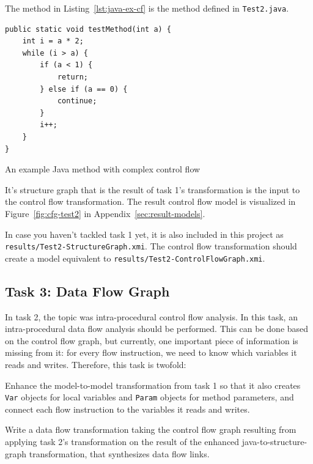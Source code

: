 \documentclass[10pt]{article}
\begin{document}
The method in Listing~\ref{lst:java-ex-cf} is the method defined in
\verb|Test2.java|.

\begin{listing}
  \begin{verbatim}
public static void testMethod(int a) {
    int i = a * 2;
    while (i > a) {
        if (a < 1) {
            return;
        } else if (a == 0) {
            continue;
        }
        i++;
    }
}
  \end{verbatim}
  \caption{An example Java method with complex control flow}
  \label{lst:java-ex-cf}
\end{listing}

It's structure graph that is the result of task 1's transformation is the input
to the control flow transformation.  The result control flow model is
visualized in Figure~\ref{fig:cfg-test2} in Appendix~\ref{sec:result-models}.

In case you haven't tackled task 1 yet, it
is also included in this project as \verb|results/Test2-StructureGraph.xmi|.
The control flow transformation should create a model equivalent to
\verb|results/Test2-ControlFlowGraph.xmi|.


\subsection{Task 3: Data Flow Graph}
\label{sec:task3-df-graph}

In task 2, the topic was intra-procedural control flow analysis.  In this task,
an intra-procedural data flow analysis should be performed.  This can be done
based on the control flow graph, but currently, one important piece of
information is missing from it: for every flow instruction, we need to know
which variables it reads and writes.  Therefore, this task is twofold:

\begin{compactenum}
\item Enhance the model-to-model transformation from task 1 so that it also
  creates \verb|Var| objects for local variables and \verb|Param| objects for
  method parameters, and connect each flow instruction to the variables it
  reads and writes.
\item Write a data flow transformation taking the control flow graph resulting
  from applying task 2's transformation on the result of the enhanced
  java-to-structure-graph transformation, that synthesizes data flow links.
\end{compactenum}
\end{document}
